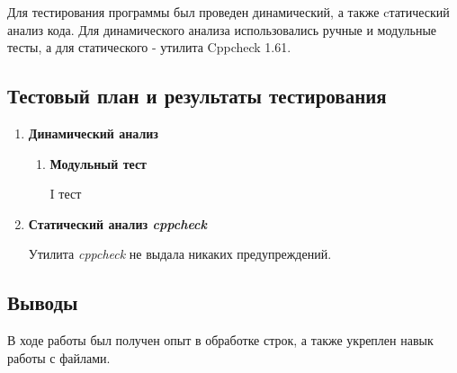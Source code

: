 \documentclass[12pt,a4paper]{report}
\begin{document}
Для тестирования программы был проведен динамический, а также cтатический анализ кода. Для динамического анализа использовались ручные и модульные тесты, а для статического - утилита Cppcheck 1.61.
\subsection{Тестовый план и результаты тестирования}
\begin{enumerate}
\item \textbf{Динамический анализ}
\begin{enumerate}
\item \textbf{Модульный тест}
\begin{description}
\item[I тест]
\hspace{\parindent}
\begin{flushleft}
\end{flushleft}
\end{description}
\end{enumerate}
\item \textbf{Статический анализ \textit{cppcheck}}

Утилита \textit{cppcheck} не выдала никаких предупреждений.
\end{enumerate}


\subsection{Выводы}
\hspace{\parindent}
В ходе работы был получен опыт в обработке строк, а также укреплен навык работы с файлами.
\end{document}
